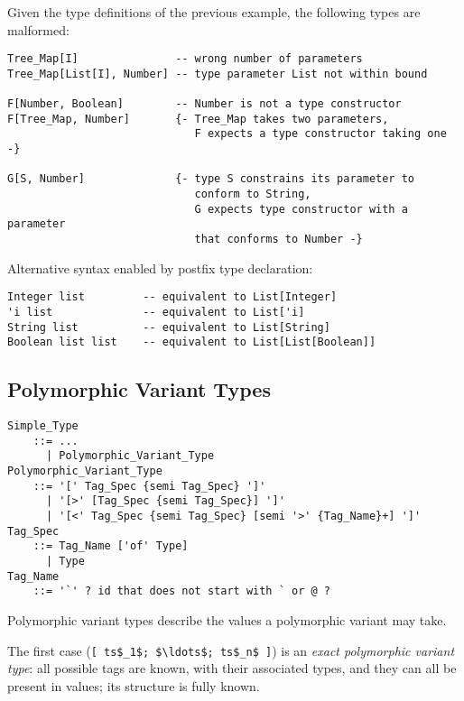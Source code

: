 \example
\label{example:parameterized-types-mal}

Given the type definitions of the previous example, the following types are malformed: 

\begin{lstlisting}
Tree_Map[I]               -- wrong number of parameters
Tree_Map[List[I], Number] -- type parameter List not within bound

F[Number, Boolean]        -- Number is not a type constructor
F[Tree_Map, Number]       {- Tree_Map takes two parameters, 
                             F expects a type constructor taking one -}

G[S, Number]              {- type S constrains its parameter to
                             conform to String, 
                             G expects type constructor with a parameter
                             that conforms to Number -}
\end{lstlisting}

\example Alternative syntax enabled by postfix type declaration:

\begin{lstlisting}
Integer list         -- equivalent to List[Integer]
'i list              -- equivalent to List['i]
String list          -- equivalent to List[String]
Boolean list list    -- equivalent to List[List[Boolean]]
\end{lstlisting}





\subsection{Polymorphic Variant Types}
\label{sec:polymorphic-variant-types}

\grammar\begin{lstlisting}[deletekeywords={not,with,or}]
Simple_Type 
    ::= ...
      | Polymorphic_Variant_Type
Polymorphic_Variant_Type 
    ::= '[' Tag_Spec {semi Tag_Spec} ']'
      | '[>' [Tag_Spec {semi Tag_Spec}] ']'
      | '[<' Tag_Spec {semi Tag_Spec} [semi '>' {Tag_Name}+] ']'
Tag_Spec 
    ::= Tag_Name ['of' Type]
      | Type
Tag_Name 
    ::= '`' ? id that does not start with ` or @ ?
\end{lstlisting}

Polymorphic variant types describe the values a polymorphic variant may take. 

The first case (\lstinline![ ts$_1$; $\ldots$; ts$_n$ ]!) is an {\em exact polymorphic variant type}: all possible tags are known, with their associated types, and they can all be present in values; its structure is fully known. 

